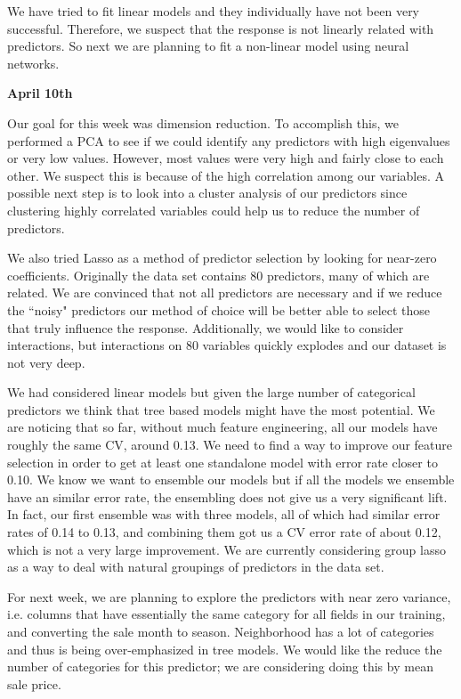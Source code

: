 \documentclass[12pt]{article}
\begin{document}
We have tried to fit linear models and they individually have not been very successful.  Therefore, we suspect that the response is not linearly related with predictors.  So next we are planning to fit a non-linear model using neural networks.

\textbf{April 10th}

Our goal for this week was dimension reduction.  To accomplish this, we performed a PCA to see if we could identify any predictors with high eigenvalues or very low values.  However, most values were very high and fairly close to each other.  We suspect this is because of the high correlation among our variables.  A possible next step is to look into a cluster analysis of our predictors since clustering highly correlated variables could help us to reduce the number of predictors.  %

We also tried Lasso as a method of predictor selection by looking for near-zero coefficients.  Originally the data set contains 80 predictors, many of which are related.  We are convinced that not all predictors are necessary and if we reduce the ``noisy" predictors our method of choice will be better able to select those that truly influence the response.  Additionally, we would like to consider interactions, but interactions on 80 variables quickly explodes and our dataset is not very deep.

We had considered linear models but given the large number of categorical predictors we think that tree based models might have the most potential.  We are noticing that so far, without much feature engineering, all our models have roughly the same CV, around 0.13.  We need to find a way to improve our feature selection in order to get at least one standalone model with error rate closer to 0.10.  We know we want to ensemble our models but if all the models we ensemble have an similar error rate, the ensembling does not give us a very significant lift.  In fact, our first ensemble was with three models, all of which had similar error rates of 0.14 to 0.13, and combining them got us a CV error rate of about 0.12, which is not a very large improvement.  We are currently considering group lasso as a way to deal with natural groupings of predictors in the data set.

For next week, we are planning to explore the predictors with near zero variance, i.e. columns that have essentially the same category for all fields in our training, and converting the sale month to season.  Neighborhood has a lot of categories and thus is being over-emphasized in tree models.  We would like the reduce the number of categories for this predictor; we are considering doing this by mean sale price.
\end{document}
